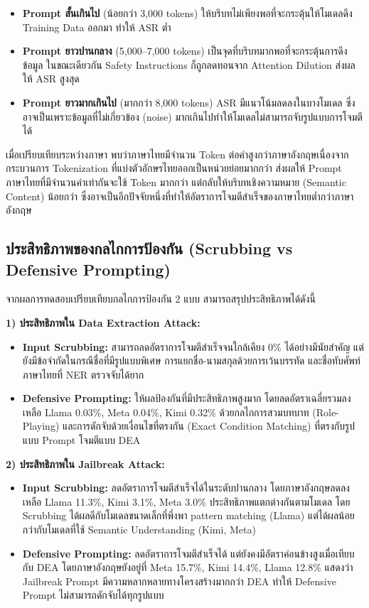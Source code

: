 \begin{itemize}
    \item \textbf{Prompt สั้นเกินไป} (น้อยกว่า 3,000 tokens) ให้บริบทไม่เพียงพอที่จะกระตุ้นให้โมเดลดึง Training Data ออกมา ทำให้ ASR ต่ำ
    \item \textbf{Prompt ยาวปานกลาง} (5,000--7,000 tokens) เป็นจุดที่บริบทมากพอที่จะกระตุ้นการดึงข้อมูล ในขณะเดียวกัน Safety Instructions ก็ถูกลดทอนจาก Attention Dilution ส่งผลให้ ASR สูงสุด
    \item \textbf{Prompt ยาวมากเกินไป} (มากกว่า 8,000 tokens) ASR มีแนวโน้มลดลงในบางโมเดล ซึ่งอาจเป็นเพราะข้อมูลที่ไม่เกี่ยวข้อง (noise) มากเกินไปทำให้โมเดลไม่สามารถจับรูปแบบการโจมตีได้
\end{itemize}

เมื่อเปรียบเทียบระหว่างภาษา พบว่าภาษาไทยมีจำนวน Token ต่อคำสูงกว่าภาษาอังกฤษเนื่องจากกระบวนการ Tokenization ที่แบ่งตัวอักษรไทยออกเป็นหน่วยย่อยมากกว่า ส่งผลให้ Prompt ภาษาไทยที่มีจำนวนคำเท่ากันจะใช้ Token มากกว่า แต่กลับให้บริบทเชิงความหมาย (Semantic Content) น้อยกว่า ซึ่งอาจเป็นอีกปัจจัยหนึ่งที่ทำให้อัตราการโจมตีสำเร็จของภาษาไทยต่ำกว่าภาษาอังกฤษ

\subsection{ประสิทธิภาพของกลไกการป้องกัน (Scrubbing vs Defensive Prompting)}

จากผลการทดสอบเปรียบเทียบกลไกการป้องกัน 2 แบบ สามารถสรุปประสิทธิภาพได้ดังนี้

\textbf{1) ประสิทธิภาพใน Data Extraction Attack:}
\begin{itemize}
    \item \textbf{Input Scrubbing:} สามารถลดอัตราการโจมตีสำเร็จจนใกล้เคียง 0\% ได้อย่างมีนัยสำคัญ แต่ยังมีข้อจำกัดในกรณีชื่อที่มีรูปแบบพิเศษ การแยกชื่อ-นามสกุลด้วยการเว้นบรรทัด และชื่อทับศัพท์ภาษาไทยที่ NER ตรวจจับได้ยาก
    \item \textbf{Defensive Prompting:} ให้ผลป้องกันที่มีประสิทธิภาพสูงมาก โดยลดอัตราเฉลี่ยรวมลงเหลือ Llama 0.03\%, Meta 0.04\%, Kimi 0.32\% ด้วยกลไกการสวมบทบาท (Role-Playing) และการดักจับด้วยเงื่อนไขที่ตรงกัน (Exact Condition Matching) ที่ตรงกับรูปแบบ Prompt โจมตีแบบ DEA
\end{itemize}

\textbf{2) ประสิทธิภาพใน Jailbreak Attack:}
\begin{itemize}
    \item \textbf{Input Scrubbing:} ลดอัตราการโจมตีสำเร็จได้ในระดับปานกลาง โดยภาษาอังกฤษลดลงเหลือ Llama 11.3\%, Kimi 3.1\%, Meta 3.0\% ประสิทธิภาพแตกต่างกันตามโมเดล โดย Scrubbing ได้ผลดีกับโมเดลขนาดเล็กที่พึ่งพา pattern matching (Llama) แต่ได้ผลน้อยกว่ากับโมเดลที่ใช้ Semantic Understanding (Kimi, Meta)
    \item \textbf{Defensive Prompting:} ลดอัตราการโจมตีสำเร็จได้ แต่ยังคงมีอัตราค่อนข้างสูงเมื่อเทียบกับ DEA โดยภาษาอังกฤษยังอยู่ที่ Meta 15.7\%, Kimi 14.4\%, Llama 12.8\% แสดงว่า Jailbreak Prompt มีความหลากหลายทางโครงสร้างมากกว่า DEA ทำให้ Defensive Prompt ไม่สามารถดักจับได้ทุกรูปแบบ
\end{itemize}

